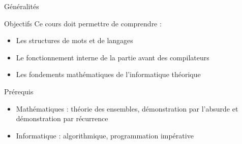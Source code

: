 
\begingroup
 
\begin{frame}{Généralités}
  \begin{block}{Objectifs}
    Ce cours doit permettre de comprendre : 
    \begin{itemize}
    \item Les structures de mots et de langages
    \item Le fonctionnement interne de la partie avant des compilateurs
    \item Les fondements mathématiques de l'informatique théorique 
    \end{itemize}
  \end{block}
 
  \begin{block}{Prérequis}
    \begin{itemize}
    \item Mathématiques : théorie des ensembles, démonstration par l'absurde et démonstration par récurrence
    \item Informatique : algorithmique, programmation impérative 
    \end{itemize}
  \end{block}
\end{frame}

\endgroup
